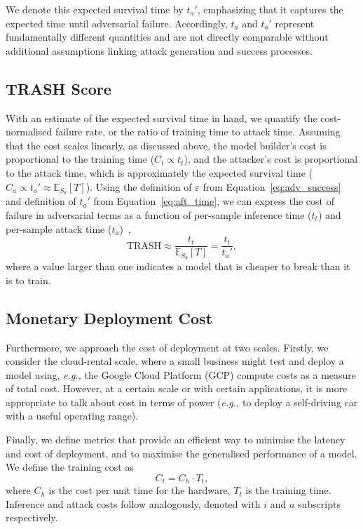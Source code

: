 \documentclass[conference]{IEEEtran}%
\begin{document}
We denote this expected survival time by $t_a'$, emphasizing that it captures 
the expected time until adversarial failure. 
Accordingly, $t_a$ and $t_a'$ 
represent fundamentally different quantities and are not directly comparable 
without additional assumptions linking attack generation and success processes.

\subsection{TRASH Score}
With an estimate of the expected survival time in hand, we quantify the cost-normalised failure rate, or the ratio of training time to attack time. 
Assuming that the cost scales linearly, as discussed above, the model builder's cost is proportional to the training time ($C_t \propto t_{t}$), and the attacker's cost is proportional to the attack time, which is approximately the expected survival time ($C_{a} \propto t_{a}' \approx \mathbb{E}_{S_\theta}[T]$). 
Using the definition of $\varepsilon$ from Equation~\ref{eq:adv_success} and definition of $t_a'$ from Equation~\ref{eq:aft_time}, we can express the cost of failure in adversarial terms as a function of per-sample inference time ($t_t$) and per-sample attack time ($t_a$)~\cite{meyers_aft},
\begin{equation}
	\textrm{TRASH}\approx \frac{t_t}{\mathbb{E}_{S_\theta}[T]} = \frac{t_t}{t_a'},
	\label{eq:cost}
\end{equation}
where a value larger than one indicates a model that is cheaper to break than it is to train.

\subsection{Monetary Deployment Cost}

Furthermore, we approach the cost of deployment at two scales. 
Firstly, we consider the cloud-rental scale, where a small business might test and deploy a model using, \textit{e.g.,} the Google Cloud Platform (GCP) compute costs as a measure of total cost. 
However, at a certain scale or with certain applications, it is more appropriate to talk about cost in terms of power (\textit{e.g.,} to deploy a self-driving car with a useful operating range). 

Finally, we define metrics that provide an efficient way to minimise the latency and cost of deployment, and to maximise the generalised performance of a model. 
We define the training cost as
\[
    C_t = C_h \cdot T_t,
\]
where $C_h$ is the cost per unit time for the hardware, $T_t$ is the training time.
Inference and attack costs follow analogously, denoted with $i$ and $a$ subscripts respectively.
\end{document}
